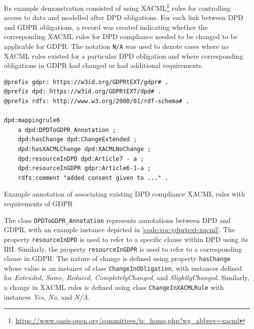 Its example demonstration consisted of using XACML\footnote{\url{https://www.oasis-open.org/committees/tc_home.php?wg_abbrev=xacml}} rules for controlling access to data and modelled after DPD obligations.
For each link between DPD and GDPR obligations, a record was created indicating whether the corresponding XACML rules for DPD compliance needed to be changed to be applicable for GDPR. The notation \texttt{N/A} was used to denote cases where no XACML rules existed for a particular DPD obligation and where corresponding obligations in GDPR had changed or had additional requirements. 
\begin{listing}[htbp]
\begin{verbatim}
@prefix gdpr: https://w3id.org/GDPRtEXT/gdpr# .
@prefix dpd: https://w3id.org/GDPRtEXT/dpd# .
@prefix rdfs: http://www.w3.org/2000/01/rdf-schema# .

dpd:mappingrule6
    a dpd:DPDToGDPR_Annotation ;
    dpd:hasChange dpd:ChangeExtended ;
    dpd:hasXACMLChange dpd:XACMLNoChange ;
    dpd:resourceInDPD dpd:Article7 - a ;
    dpd:resourceInGDPR gdpr:Article6-1-a ;
    rdfs:comment "added consent given to ..." .
\end{verbatim}
\caption{Example annotation of associating existing DPD compliance XACML rules with requirements of GDPR}
\label{code:voc:gdprtext-xacml}
\end{listing}

The class \texttt{DPDToGDPR\_Annotation} represents annotations between DPD and GDPR, with an example instance depicted in \autoref{code:voc:gdprtext-xacml}. The property \texttt{resourceInDPD} is used to refer to a specific clause within DPD using its IRI. Similarly, the property \texttt{resourceInGDPR} is used to refer to a corresponding clause in GDPR. The nature of change is defined using property \texttt{hasChange} whose value is an instance of class \texttt{ChangeInObligation}, with instances defined for \textit{Extended, Same, Reduced, CompletelyChanged}, and \textit{SlightlyChanged}. Similarly, a change in XACML rules is defined using class \texttt{ChangeInXACMLRule} with instances \textit{Yes, No}, and \textit{N/A}.

